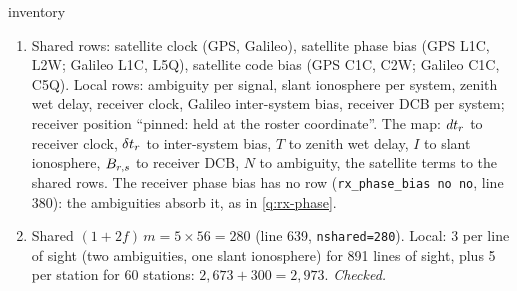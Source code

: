 \begin{answer}{inventory}
\solution
\begin{enumerate}[leftmargin=*, itemsep=1pt]
\item Shared rows: satellite clock (GPS, Galileo), satellite phase bias (GPS L1C,
      L2W; Galileo L1C, L5Q), satellite code bias (GPS C1C, C2W; Galileo C1C, C5Q).
      Local rows: ambiguity per signal, slant ionosphere per system, zenith wet delay,
      receiver clock, Galileo inter-system bias, receiver DCB per system; receiver
      position ``pinned: held at the roster coordinate''. The map: $dt_r$
      to receiver clock, $\delta t_r$ to inter-system bias, $T$ to zenith wet
      delay, $I$ to slant ionosphere, $B_{r,s}$ to receiver DCB, $N$ to
      ambiguity, the satellite terms to the shared rows. The receiver phase bias has
      no row (\texttt{rx\_phase\_bias no no}, line 380): the ambiguities absorb it, as
      in \cref{q:rx-phase}.
\item Shared $(1 + 2f)\,m = 5\times56 = 280$ (line 639, \texttt{nshared=280}).
      Local: 3 per line of sight (two ambiguities, one slant ionosphere) for 891
      lines of sight, plus 5 per station for 60 stations: $2{,}673 + 300 = 2{,}973$.
      \emph{Checked.}
\end{enumerate}
\end{answer}

